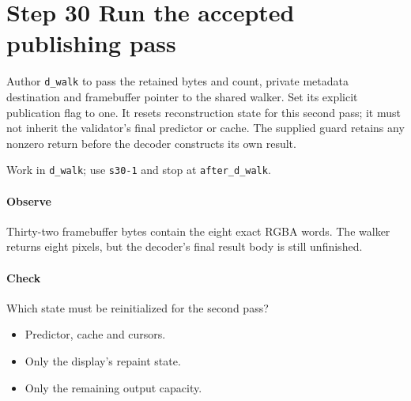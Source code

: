 \section{Step 30 Run the accepted publishing pass}\label{qoi-s30}
Author \texttt{d\_walk} to pass the retained bytes and count, private metadata destination and framebuffer pointer to the shared walker. Set its explicit publication flag to one. It resets reconstruction state for this second pass; it must not inherit the validator’s final predictor or cache. The supplied guard retains any nonzero return before the decoder constructs its own result.

Work in \texttt{d\_walk}; use \texttt{s30-1} and stop at \texttt{after\_d\_walk}.

\paragraph{Observe} Thirty-two framebuffer bytes contain the eight exact RGBA words. The walker returns eight pixels, but the decoder’s final result body is still unfinished.

\paragraph{Check} Which state must be reinitialized for the second pass?
\begin{itemize}
  \item[A.] Predictor, cache and cursors.
  \item[B.] Only the display’s repaint state.
  \item[C.] Only the remaining output capacity.
\end{itemize}
